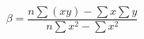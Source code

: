\begin{equation}
\beta = \frac{n \sum (xy) - \sum x \sum y}{n \sum x^2 - \sum x^2}
\label{eq:linear_regression}
\end{equation}
